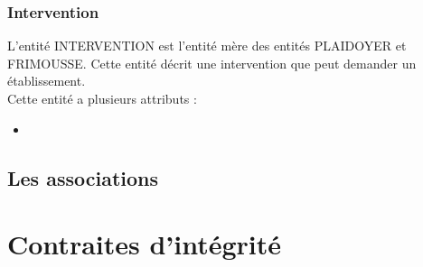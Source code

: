 \documentclass[asi, sansVersion]{picINSA}
\begin{document}
\subsection*{Intervention}
L'entité INTERVENTION est l'entité mère des entités PLAIDOYER et FRIMOUSSE. Cette entité décrit une intervention que peut demander un établissement. \\
Cette entité a plusieurs attributs :
\begin{itemize}
\item
\end{itemize}

\section{Les associations}

\chapter{Contraites d'intégrité}
\end{document}
